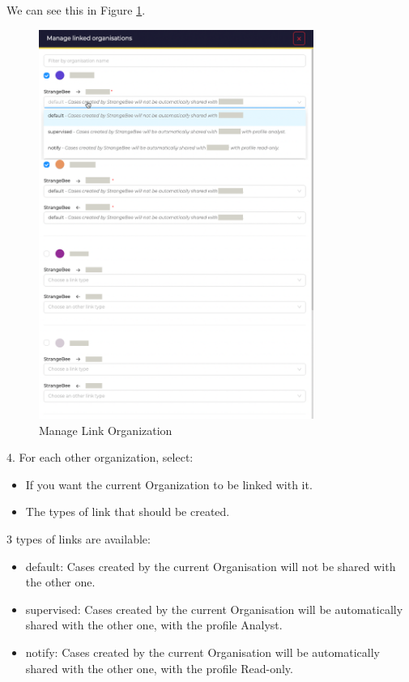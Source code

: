 \documentclass{article}
\begin{document}
We can see this in Figure \ref{fig:manage}.\\
\begin{figure}[h!]
    \centering
    \includegraphics[width=0.8\textwidth]{img16.png}
    \caption{Manage Link Organization}
    \label{fig:manage}
\end{figure}
4. For each other organization, select:\\
    \begin{itemize}
        \item If you want the current Organization to be linked with it.
        \item The types of link that should be created.
    \end{itemize}
3 types of links are available:

\begin{itemize}
    \item default: Cases created by the current Organisation will not be shared with the other one.
    \item supervised: Cases created by the current Organisation will be automatically shared with the other one, with the profile Analyst.
    \item notify: Cases created by the current Organisation will be automatically shared with the other one, with the profile Read-only.
\end{itemize}
\end{document}
